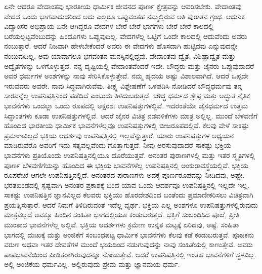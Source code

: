 ಏನೇ ಆದರೂ ವೇದಾಂತವು ಭಾರತೀಯ ಧಾರ್ಮಿಕ ಜೀವನದ ಪೂರ್ಣ ಕ್ಷೇತ್ರವನ್ನು ಆವರಿಸಬೇಕು. ವೇದಾಂತವು ವೇದದ ಒಂದು ಭಾಗವಾದುದರಿಂದ ಅದು ಎಲ್ಲರೂ ಒಪ್ಪುವಂತಹ ನಮ್ಮಲ್ಲಿರುವ ಅತಿ ಪುರಾತನ ಗ್ರಂಥ. ಆಧುನಿಕ ವಿದ್ವಾಂಸರ ಅಭಿಪ್ರಾಯ ಏನೇ ಆಗಿದ್ದರೂ ವೇದಗಳ ಬೇರೆ ಬೇರೆ ಭಾಗಗಳು ಬೇರೆ ಬೇರೆ ಕಾಲದಲ್ಲಿ ಬರೆಯಲ್ಪಟ್ಟವೆಂಬುದನ್ನು ಹಿಂದೂಗಳು ಒಪ್ಪುವುದಿಲ್ಲ. ವೇದಗಳೆಲ್ಲ ಒಟ್ಟಿಗೆ ಒಂದೇ ಕಾಲದಲ್ಲಿ ಆದುವೆಂದು ಅವರು ನಂಬುತ್ತಾರೆ. ಆದರೆ ನಿಜವಾಗಿ ಹೇಳಬೇಕೆಂದರೆ ಅವರು ಈ ವೇದಗಳು ಹೊಸದಾಗಿ ಹುಟ್ಟಿದವು ಎನ್ನುವುದನ್ನೇ ನಂಬುವುದಿಲ್ಲ. ಅವು ಯಾವಾಗಲೂ ಭಗವಂತನ ಮನಸ್ಸಿನಲ್ಲಿದ್ದವು. ವೇದಾಂತವು ದ್ವೈತ, ವಿಶಿಷ್ಟಾದ್ವೈತ ಮತ್ತು ಅದ್ವೈತಗಳನ್ನು ಒಳಗೊಳ್ಳುತ್ತದೆ. ನನ್ನ ದೃಷ್ಟಿಯಲ್ಲಿ ವೇದಾಂತವೆಂದರೆ ಇದೇ. ಬೌದ್ಧರು ಮತ್ತು ಜೈನರು ಒಪ್ಪುವುದಾದರೆ ಅವರ ಧರ್ಮಗಳ ಅಂಶಗಳನ್ನು ನಾವು ಸೇರಿಸಿಕೊಳ್ಳುತ್ತೇವೆ. ನಮ್ಮ ಹೃದಯ ಅಷ್ಟು ವಿಶಾಲವಾಗಿದೆ. ಆದರೆ ಒಪ್ಪದೇ ಇರುವವರು ಅವರೇ. ನಾವು ಸಿದ್ಧವಾಗಿರುವೆವು. ತೀಕ್ಷ್ಣ ವಿಶ್ಲೇಷಣೆಗೆ ಒಳಪಡಿಸಿ ನೋಡಿದರೆ ಬೌದ್ಧಧರ್ಮವು ತನ್ನ ಸಾರವನ್ನೆಲ್ಲ ಉಪನಿಷತ್ತಿನಿಂದ ಪಡೆದಿದೆ ಎಂಬುದು ತಿಳಿದುಬರುತ್ತದೆ. ಬೌದ್ಧ ಧರ್ಮದ ಶ್ರೇಷ್ಠ ಮತ್ತು ಅದ್ಭುತ ನೈತಿಕ ಭಾವನೆಗಳು ಒಂದಲ್ಲಾ ಒಂದು ರೂಪದಲ್ಲಿ ಅಕ್ಷರಶಃ ಉಪನಿಷತ್ತುಗಳಲ್ಲಿವೆ. ಇದರಂತೆಯೇ ಜೈನಧರ್ಮದ ಉತ್ತಮ ಸಿದ್ಧಾಂತಗಳು ಕೂಡಾ ಉಪನಿಷತ್ತುಗಳಲ್ಲಿವೆ. ಆದರೆ ಜೈನರ ವಿಚಿತ್ರ ನಡವಳಿಕೆಗಳು ಮಾತ್ರ ಅಲ್ಲಿಲ್ಲ. ಮುಂದೆ ಬೆಳವಣಿಗೆ ಹೊಂದಿದ ಭಾರತೀಯ ಧಾರ್ಮಿಕ ಭಾವನೆಗಳೆಲ್ಲವೂ ಉಪನಿಷತ್ತುಗಳಲ್ಲಿ ಬೀಜರೂಪದಲ್ಲಿವೆ. ಕೆಲವು ವೇಳೆ ಸಾಕಷ್ಟು ಪ್ರಮಾಣವಿಲ್ಲದೆ ಭಕ್ತಿಯ ಆದರ್ಶವು ಉಪನಿಷತ್ತಿನಲ್ಲಿ ಇಲ್ಲವೆನ್ನುತ್ತಾರೆ. ಯಾರು ಉಪನಿಷತ್ತುಗಳ ಅಧ್ಯಯನ ಮಾಡಿರುವರೊ ಅವರಿಗೆ ಇದು ಸತ್ಯವಲ್ಲವೆಂದು ಗೊತ್ತಾಗುತ್ತದೆ. ನೀವು ಅರಸುವುದಾದರೆ ಸಾಕಷ್ಟು ಭಕ್ತಿಯ ಭಾವನೆಗಳು ಪ್ರತಿಯೊಂದು ಉಪನಿಷತ್ತಿನಲ್ಲಿಯೂ ದೊರೆಯುತ್ತವೆ. ಅನಂತರ ಪುರಾಣಗಳಲ್ಲಿ ಮತ್ತು ಇತರ ಸ್ಮೃತಿಗಳಲ್ಲಿ ಪೂರ್ಣ ಬೆಳವಣಿಗೆಯನ್ನು ಹೊಂದಿದ ಈ ಭಕ್ತಿಯ ಭಾವನೆಗಳೆಲ್ಲ ಉಪನಿಷತ್ತಿನಲ್ಲಿ ಅಂಕುರಾವಸ್ಥೆಯಲ್ಲಿವೆ. ಭಕ್ತಿಯ ರೂಪರೇಖೆ ಆಗಲೇ ಉಪನಿಷತ್ತಿನಲ್ಲಿದೆ. ಅನಂತರದ ಪುರಾಣಗಳು ಅದಕ್ಕೆ ಪೂರ್ಣರೂಪವನ್ನು ನೀಡಿದವು, ಅಷ್ಟೇ. ಭರತಖಂಡದಲ್ಲಿ ಸ್ಪಷ್ಟವಾಗಿ ಅನಂತರ ಪ್ರಕಾಶಕ್ಕೆ ಬಂದ ಯಾವ ಒಂದು ಆದರ್ಶವೂ ಉಪನಿಷತ್ತಿನಲ್ಲಿ ಇಲ್ಲದೇ ಇಲ್ಲ. ಸಾಕಷ್ಟು ಉಪನಿಷತ್ತಿನ ಜ್ಞಾನವಿಲ್ಲದ ಕೆಲವರು ಭಕ್ತಿಯು ಹೊರದೇಶದಿಂದ ಬಂತೆಂದು ಪ್ರಮಾಣೀಕರಿಸಲು ವಿಚಿತ್ರವಾಗಿ ಪ್ರಯತ್ನಿಸುತ್ತಾರೆ. ಆದರೆ ನಿಮಗೆ ತಿಳಿದಿರುವಂತೆ ಇದೆಲ್ಲ ವ್ಯರ್ಥ. ಭಕ್ತಿಯ ಎಲ್ಲ ಅಂಶಗಳೂ ಉಪನಿಷತ್ತುಗಳಲ್ಲಿರುವುದು ಮಾತ್ರವಲ್ಲದೆ ಅವಕ್ಕೂ ಹಿಂದಿನ ಸಂಹಿತಾ ಭಾಗದಲ್ಲಿಯೂ ಕಂಡುಬರುತ್ತದೆ. ಭಕ್ತಿಗೆ ಸಂಬಂಧಿಸಿದ ಪೂಜೆ, ಪ್ರೀತಿ ಮುಂತಾದ ಭಾವನೆಗಳೆಲ್ಲ ಅಲ್ಲಿವೆ. ಭಕ್ತಿಯ ಆದರ್ಶಗಳು ಕ್ರಮೇಣ ಉನ್ನತ ಮಟ್ಟಕ್ಕೆ ಏರಿದವು, ಅಷ್ಟೆ. ಸಂಹಿತಾ ಭಾಗದಲ್ಲಿ ದುಃಖಕ್ಕೆ ಮತ್ತು ಅಂಜಿಕೆಗೆ ಸಂಬಂಧಪಟ್ಟ ಧಾರ್ಮಿಕ ಭಾವನೆಗಳು ಕೆಲವು ಕಡೆ ಕಂಡುಬರುತ್ತವೆ. ಪೂಜಕನು ವರುಣ ಅಥವಾ ಇತರ ದೇವತೆಗಳ ಮುಂದೆ ಭಯದಿಂದ ನಡುಗುವುದನ್ನು ನಾವು ಸಂಹಿತೆಯಲ್ಲಿ ಕಾಣುತ್ತೇವೆ. ಅವರು ಪಾಪಭಾವನೆಯಿಂದ ಪೀಡಿತರಾಗಿರುವುದನ್ನೂ ನೋಡುತ್ತೇವೆ. ಆದರೆ ಉಪನಿಷತ್ತಿನಲ್ಲಿ ಇಂತಹ ಭಾವನೆಗಳಿಗೆ ಸ್ಥಳವಿಲ್ಲ. ಅಲ್ಲಿ ಅಂಜಿಕೆಯ ಧರ್ಮವಿಲ್ಲ. ಅಲ್ಲಿರುವುದು ಪ್ರೇಮ ಮತ್ತು ಜ್ಞಾನಮಯ ಧರ್ಮ.


